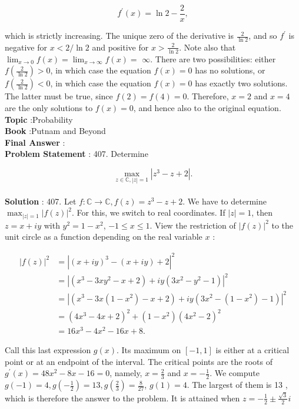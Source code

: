 \documentclass[10pt]{article}
\begin{document}
$$
f^{\prime}(x)=\ln 2-\frac{2}{x},
$$

which is strictly increasing. The unique zero of the derivative is $\frac{2}{\ln 2}$, and so $f^{\prime}$ is negative for $x<2 / \ln 2$ and positive for $x>\frac{2}{\ln 2}$. Note also that $\lim _{x \rightarrow 0} f(x)=\lim _{x \rightarrow \infty} f(x)=$ $\infty$. There are two possibilities: either $f\left(\frac{2}{\ln 2}\right)>0$, in which case the equation $f(x)=0$ has no solutions, or $f\left(\frac{2}{\ln 2}\right)<0$, in which case the equation $f(x)=0$ has exactly two solutions. The latter must be true, since $f(2)=f(4)=0$. Therefore, $x=2$ and $x=4$ are the only solutions to $f(x)=0$, and hence also to the original equation.
\\
\textbf{Topic} :Probability\\
\textbf{Book} :Putnam and Beyond\\
\textbf{Final Answer} :\\


\textbf{Problem Statement} :
407. Determine

$$
\max _{z \in \mathbb{C},|z|=1}\left|z^{3}-z+2\right| .
$$
\\
\textbf{Solution} :
407. Let $f: \mathbb{C} \rightarrow \mathbb{C}, f(z)=z^{3}-z+2$. We have to determine $\max _{|z|=1}|f(z)|^{2}$. For this, we switch to real coordinates. If $|z|=1$, then $z=x+i y$ with $y^{2}=1-x^{2}$, $-1 \leq x \leq 1$. View the restriction of $|f(z)|^{2}$ to the unit circle as a function depending on the real variable $x$ :

$$
\begin{aligned}
|f(z)|^{2} &=\left|(x+i y)^{3}-(x+i y)+2\right|^{2} \\
&=\left|\left(x^{3}-3 x y^{2}-x+2\right)+i y\left(3 x^{2}-y^{2}-1\right)\right|^{2} \\
&=\left|\left(x^{3}-3 x\left(1-x^{2}\right)-x+2\right)+i y\left(3 x^{2}-\left(1-x^{2}\right)-1\right)\right|^{2} \\
&=\left(4 x^{3}-4 x+2\right)^{2}+\left(1-x^{2}\right)\left(4 x^{2}-2\right)^{2} \\
&=16 x^{3}-4 x^{2}-16 x+8 .
\end{aligned}
$$

Call this last expression $g(x)$. Its maximum on $[-1,1]$ is either at a critical point or at an endpoint of the interval. The critical points are the roots of $g^{\prime}(x)=48 x^{2}-8 x-16=0$, namely, $x=\frac{2}{3}$ and $x=-\frac{1}{2}$. We compute $g(-1)=4, g\left(-\frac{1}{2}\right)=13, g\left(\frac{2}{3}\right)=\frac{8}{27}$, $g(1)=4$. The largest of them is 13 , which is therefore the answer to the problem. It is attained when $z=-\frac{1}{2} \pm \frac{\sqrt{3}}{2} i$
\end{document}

